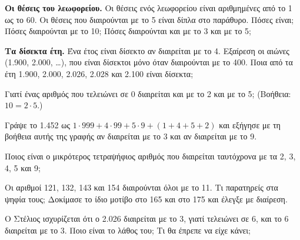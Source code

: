 \ex \textbf{Οι θέσεις του λεωφορείου.} Οι θέσεις ενός λεωφορείου είναι αριθμημένες από το 1 ως το 60. Οι θέσεις που διαιρούνται με το 5 είναι δίπλα στο παράθυρο. Πόσες είναι; Πόσες διαιρούνται με το 10; Πόσες διαιρούνται και με το 3 και με το 5;

\ex \textbf{Τα δίσεκτα έτη.} Ένα έτος είναι δίσεκτο αν διαιρείται με το 4. Εξαίρεση οι αιώνες (1.900, 2.000, \dots), που είναι δίσεκτοι μόνο όταν διαιρούνται με το 400. Ποια από τα έτη 1.900, 2.000, 2.026, 2.028 και 2.100 είναι δίσεκτα;


\ex Γιατί ένας αριθμός που τελειώνει σε 0 διαιρείται και με το 2 και με το 5; (Βοήθεια: $10=2\cdot 5$.)

\ex Γράψε το 1.452 ως $1\cdot 999+4\cdot 99+5\cdot 9+(1+4+5+2)$ και εξήγησε με τη βοήθεια αυτής της γραφής αν διαιρείται με το 3 και αν διαιρείται με το 9.

\ex Ποιος είναι ο μικρότερος τετραψήφιος αριθμός που διαιρείται ταυτόχρονα με τα 2, 3, 4, 5 και 9;

\ex Οι αριθμοί 121, 132, 143 και 154 διαιρούνται όλοι με το 11. Τι παρατηρείς στα ψηφία τους; Δοκίμασε το ίδιο μοτίβο στο 165 και στο 175 και έλεγξε με διαίρεση.

\ex Ο Στέλιος ισχυρίζεται ότι ο 2.026 διαιρείται με το 3, γιατί τελειώνει σε 6, και το 6 διαιρείται με το 3. Ποιο είναι το λάθος του; Τι θα έπρεπε να είχε κάνει;
